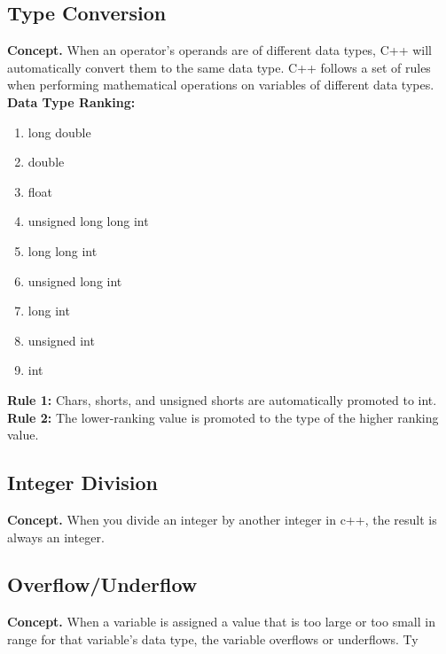 \documentclass{report}
\begin{document}
    \bigbreak \noindent   
    \subsection{Type Conversion}
    \textbf{Concept.} When an operator's operands are of different data types, C++ will automatically convert them to the same data type. C++ follows a set of rules when performing mathematical operations on variables of different data types.
    \bigbreak \noindent 
    \textbf{Data Type Ranking:}
    \begin{enumerate}
        \item long double
        \item double 
        \item float
        \item unsigned long long int
        \item long long int
        \item unsigned long int
        \item long int
        \item unsigned int
        \item int
    \end{enumerate}
    \bigbreak \noindent 
    \textbf{Rule 1:} Chars, shorts, and unsigned shorts are automatically promoted to int.
    \bigbreak \noindent 
    \textbf{Rule 2:} The lower-ranking value is promoted to the type of the higher ranking value.


    \bigbreak \noindent
    \subsection{Integer Division}
    \bigbreak \noindent 
    \textbf{Concept.} When you divide an integer by another integer in c++, the result is always an integer.

    \bigbreak \noindent 
    \subsection{Overflow/Underflow}
    \bigbreak \noindent 
    \textbf{Concept.} When a variable is assigned a value that is too large or too small in range for that variable's data type, the variable overflows or underflows. Ty
    \bigbreak \noindent 
    
    \bigbreak \noindent 
\end{document}
